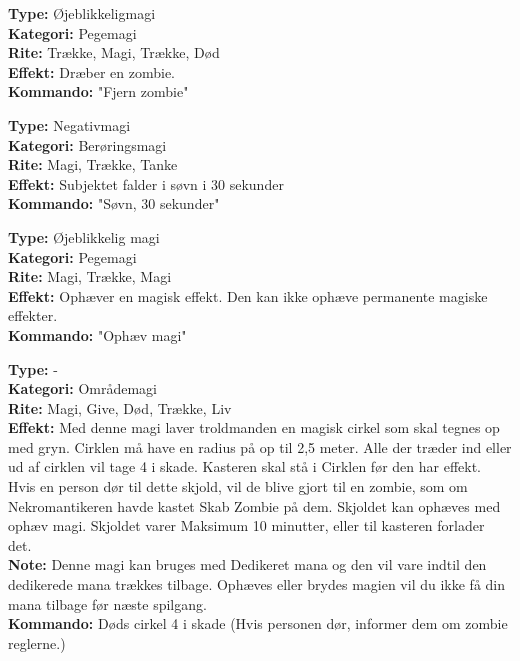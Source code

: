 \begin{primærMagi*}
\textbf{Type:} Øjeblikkeligmagi\\
\textbf{Kategori:} Pegemagi\\
\textbf{Rite:} Trække, Magi, Trække, Død\\
\textbf{Effekt:} Dræber en zombie.\\
\textbf{Kommando:} "Fjern zombie"
\end{primærMagi*}

\begin{primærMagi*}[Søvn]
\textbf{Type:} Negativmagi\\
\textbf{Kategori:} Berøringsmagi\\
\textbf{Rite:} Magi, Trække, Tanke\\
\textbf{Effekt:} Subjektet falder i søvn i 30 sekunder\\
\textbf{Kommando:} "Søvn, 30 sekunder"\\
\end{primærMagi*}

\begin{primærMagi*}
\textbf{Type:} Øjeblikkelig magi\\
\textbf{Kategori:} Pegemagi\\
\textbf{Rite:} Magi, Trække, Magi\\
\textbf{Effekt:} Ophæver en magisk effekt. Den kan ikke ophæve permanente magiske effekter.\\
\textbf{Kommando:} "Ophæv magi"
\end{primærMagi*}

\begin{primærMagi*}
\textbf{Type:} -\\
\textbf{Kategori:} Områdemagi \\
\textbf{Rite:} Magi, Give, Død, Trække, Liv \\
\textbf{Effekt:} Med denne magi laver troldmanden en magisk cirkel som skal tegnes op med gryn. Cirklen må have en radius på op til 2,5 meter. Alle der træder ind eller ud af cirklen vil tage 4 i skade. Kasteren skal stå i Cirklen før den har effekt. Hvis en person dør til dette skjold, vil de blive gjort til en zombie, som om Nekromantikeren havde kastet Skab Zombie på dem. Skjoldet kan ophæves med ophæv magi. Skjoldet varer Maksimum 10 minutter, eller til kasteren forlader det.\\ 
\textbf{Note:} Denne magi kan bruges med Dedikeret mana og den vil vare indtil den dedikerede mana trækkes tilbage. Ophæves eller brydes magien vil du ikke få din mana tilbage før næste spilgang.\\
\textbf{Kommando:} Døds cirkel 4 i skade (Hvis personen dør, informer dem om zombie reglerne.)
\end{primærMagi*}

